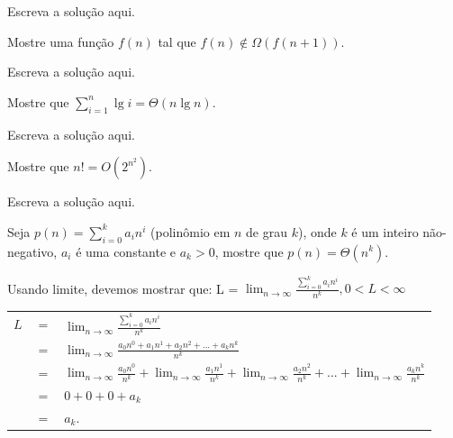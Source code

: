 \documentclass[a4paper]{exam}
\begin{document}
\begin{questions}
  \begin{solution}
    Escreva a solução aqui.
  \end{solution}
  \question Mostre uma função $f(n)$ tal que $f(n) \not\in \Omega(f(n+1))$.
  \begin{solution}
    Escreva a solução aqui.
  \end{solution}
  \question Mostre que $\sum_{i=1}^{n} \lg i = \Theta(n \lg n)$.
  \begin{solution}
    Escreva a solução aqui.
  \end{solution}
  \question Mostre que $n! = O(2^{n^2})$.
  \begin{solution}
    Escreva a solução aqui.
  \end{solution}
  \question Seja $p(n) = \sum_{i=0}^{k} a_{i}n^{i}$
  (polinômio em $n$ de grau $k$), onde $k$ é um inteiro não-negativo, $a_i$
  é uma constante e $a_k > 0$, mostre que $p(n) = \Theta(n^k)$.
  \begin{solution}
    Usando limite, devemos mostrar que: L = $\displaystyle\lim_{n\to\infty} \frac{\sum_{i=0}^{k} a_{i}n^{i}}{n^k}, 0 < L < \infty$\\
    \begin{tabular}{lll}
      $ L $&  $=$ &$ \displaystyle\lim_{n\to\infty} \frac{\sum_{i=0}^{k} a_{i}n^{i}}{n^k}$ \\
      {}& $=$ &$ \displaystyle\lim_{n\to\infty} \frac{a_0 n^0 + a_1 n^1 + a_2 n^2 + ... + a_k n^k}{n^k}$ \\
      {}& $=$ &$ \displaystyle\lim_{n\to\infty} \frac{a_0 n^0}{n^k} + 
                \displaystyle\lim_{n\to\infty} \frac{a_1 n^1}{n^k} + 
                \displaystyle\lim_{n\to\infty} \frac{a_2 n^2}{n^k} + ... + 
                \displaystyle\lim_{n\to\infty} \frac{a_k n^k}{n^k} $\\
      {}& $=$ &$ 0 + 0 + 0 + a_k $ \\
      {}& $=$ &$ a_k. $\\
    \end{tabular}


\end{solution}
\end{questions}
\end{document}
